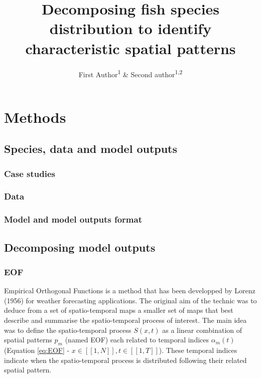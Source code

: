 \documentclass[
  english,
  man]{apa6}
\title{Decomposing fish species distribution to identify characteristic spatial patterns}
\author{First Author\textsuperscript{1} \& Second author\textsuperscript{1,2}}
\date{}
\affiliation{\vspace{0.5cm}\textsuperscript{1} Institution 1\\\textsuperscript{2} Institution 2}
\begin{document}
\maketitle

\hypertarget{methods}{%
\section{Methods}\label{methods}}

\hypertarget{species-data-and-model-outputs}{%
\subsection{Species, data and model outputs}\label{species-data-and-model-outputs}}

\hypertarget{case-studies}{%
\subsubsection{Case studies}\label{case-studies}}

\hypertarget{data}{%
\subsubsection{Data}\label{data}}

\hypertarget{model-and-model-outputs-format}{%
\subsubsection{Model and model outputs format}\label{model-and-model-outputs-format}}

\hypertarget{decomposing-model-outputs}{%
\subsection{Decomposing model outputs}\label{decomposing-model-outputs}}

\hypertarget{eof}{%
\subsubsection{EOF}\label{eof}}

Empirical Orthogonal Functions is a method that has been developped by Lorenz (1956) for weather forecasting applications. The original aim of the technic was to deduce from a set of spatio-temporal maps a smaller set of maps that best describe and summarise the spatio-temporal process of interest. The main idea was to define the spatio-temporal process \(S(x,t)\) as a linear combination of spatial patterns \(p_m\) (named EOF) each related to temporal indices \(\alpha_m(t)\) (Equation \ref{eq:EOF} - \(x\in[\![1,N]\!],t\in[\![1,T]\!]\)). These temporal indices indicate when the spatio-temporal process is distributed following their related spatial pattern.
\end{document}
